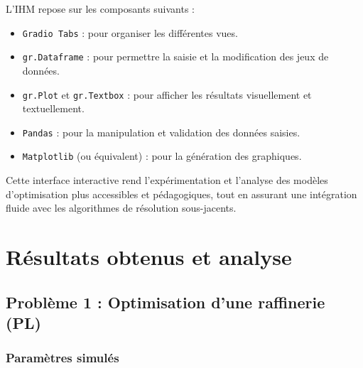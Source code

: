 \documentclass[a4paper,11pt]{article}
\begin{document}
L’IHM repose sur les composants suivants :
\begin{itemize}
    \item \texttt{Gradio Tabs} : pour organiser les différentes vues.
    \item \texttt{gr.Dataframe} : pour permettre la saisie et la modification des jeux de données.
    \item \texttt{gr.Plot} et \texttt{gr.Textbox} : pour afficher les résultats visuellement et textuellement.
    \item \texttt{Pandas} : pour la manipulation et validation des données saisies.
    \item \texttt{Matplotlib} (ou équivalent) : pour la génération des graphiques.
\end{itemize}

Cette interface interactive rend l’expérimentation et l’analyse des modèles d’optimisation plus accessibles et pédagogiques, tout en assurant une intégration fluide avec les algorithmes de résolution sous-jacents.


\section{Résultats obtenus et analyse}

\subsection{Problème 1 : Optimisation d'une raffinerie (PL)}

\subsubsection*{Paramètres simulés}
\end{document}
